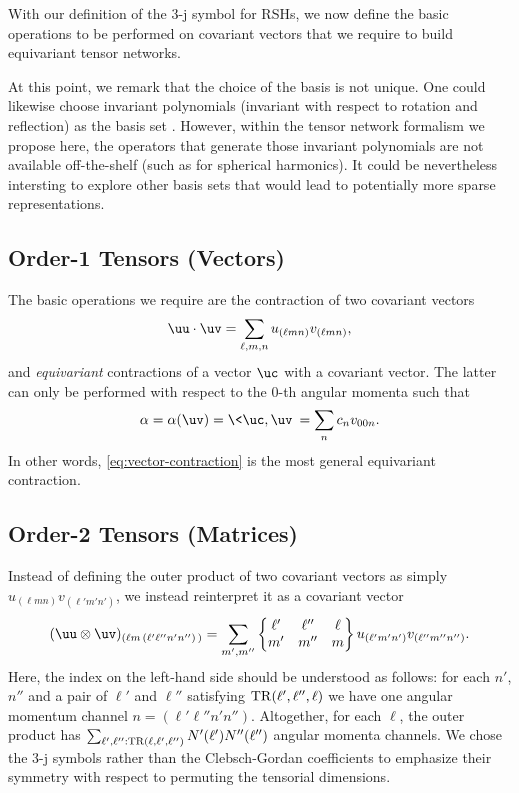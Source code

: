 With our definition of the 3-j symbol for RSHs, we now define the basic operations to be performed on covariant vectors that we require to build equivariant tensor networks.

\begin{remark}
    At this point, we remark that the choice of the basis is not unique.
    One could likewise choose invariant polynomials (invariant with respect to rotation and reflection) as the basis set \citep{shapeev_moment_2016}.
    However, within the tensor network formalism we propose here, the operators that generate those invariant polynomials are not available off-the-shelf (such as for spherical harmonics).
    It could be nevertheless intersting to explore other basis sets that would lead to potentially more sparse representations.
\end{remark}

\subsection{Order-1 Tensors (Vectors)}

The basic operations we require are the contraction of two covariant vectors
\begin{equation}
    \uu \cdot \uv = \sum_{\ell,m,n} u_{(\ell mn)} v_{(\ell mn)},
\end{equation}
and \emph{equivariant} contractions of a vector $\uc$ with a covariant vector. The latter can only be performed with respect to the 0-th angular momenta such that
\begin{equation}\label{eq:vector-contraction}
    \alpha = \alpha(\uv) = \<\uc, \uv\> = \sum_n c_n v_{00n}.
\end{equation}
In other words, \eqref{eq:vector-contraction} is the most general equivariant contraction.

\subsection{Order-2 Tensors (Matrices)}

Instead of defining the outer product of two covariant vectors as simply $u_{(\ell mn)} v_{(\ell'm'n')}$,
we instead reinterpret it as a covariant vector
\begin{equation}\label{eq:outer-g-vectors}
    (\uu \otimes \uv)_{(\ell m \,(\ell' \ell'' n'n'')\,)}
    =
    \sum_{m',m''}
    \begin{Bmatrix}
        \ell' & \ell'' & \ell \\
        m' & m'' & m
    \end{Bmatrix}
    u_{(\ell'm'n')} v_{(\ell''m''n'')}
    .
\end{equation}
Here, the index on the left-hand side should be understood as follows: for each $n'$, $n''$ and a pair of $\ell'$ and $\ell''$ satisfying ${\rm TR}(\ell',\ell'',\ell)$ we have one angular momentum channel $n=(\ell' \ell'' n'n'')$.
Altogether, for each $\ell$, the outer product has
$
\sum_{\ell',\ell'':{\rm TR}(\ell,\ell',\ell'')} N'(\ell') N''(\ell'')
$
angular momenta channels.
We chose the 3-j symbols rather than the Clebsch-Gordan coefficients to emphasize their symmetry with respect to permuting the tensorial dimensions.

